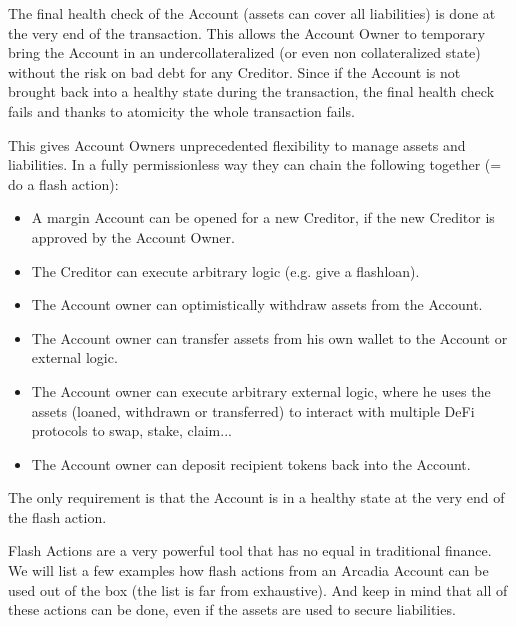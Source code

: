 \documentclass[sigconf,nonacm]{acmart}
\begin{document}
The final health check of the Account (assets can cover all liabilities) is done at the very end of the transaction.
This allows the Account Owner to temporary bring the Account in an undercollateralized (or even non collateralized state) without the risk on bad debt for any Creditor.
Since if the Account is not brought back into a healthy state during the transaction, the final health check fails and thanks to atomicity the whole transaction fails.

This gives Account Owners unprecedented flexibility to manage assets and liabilities.
In a fully permissionless way they can chain the following together (= do a flash action):
\begin{itemize}
    \item A margin Account can be opened for a new Creditor, if the new Creditor is approved by the Account Owner.
    \item The Creditor can execute arbitrary logic (e.g. give a flashloan).
    \item The Account owner can optimistically withdraw assets from the Account.
    \item The Account owner can transfer assets from his own wallet to the Account or external logic.
    \item The Account owner can execute arbitrary external logic, where he uses the assets (loaned, withdrawn or transferred) to interact with multiple DeFi protocols to swap, stake, claim...
    \item The Account owner can deposit recipient tokens back into the Account.
\end{itemize}
The only requirement is that the Account is in a healthy state at the very end of the flash action.

Flash Actions are a very powerful tool that has no equal in traditional finance.
We will list a few examples how flash actions from an Arcadia Account can be used out of the box (the list is far from exhaustive).
And keep in mind that all of these actions can be done, even if the assets are used to secure liabilities.
\end{document}
